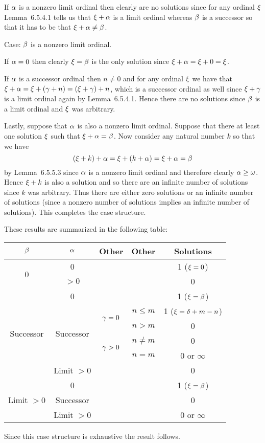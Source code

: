 \begin{solution}
    If $\alpha$ is a nonzero limit ordinal then clearly are no solutions since for any ordinal $\xi$ Lemma~6.5.4.1 tells us that $\xi + \alpha$ is a limit ordinal whereas $\beta$ is a successor so that it has to be that $\xi + \alpha \neq \beta$.

    Case: $\beta$ is a nonzero limit ordinal.

    If $\alpha = 0$ then clearly $\xi = \beta$ is the only solution since $\xi + \alpha = \xi + 0 = \xi$.

    If $\alpha$ is a successor ordinal then $n \neq 0$ and for any ordinal $\xi$ we have that $\xi + \alpha = \xi + (\gamma + n) = (\xi + \gamma) + n$, which is a successor ordinal as well since $\xi + \gamma$ is a limit ordinal again by Lemma~6.5.4.1.
    Hence there are no solutions since $\beta$ is a limit ordinal and $\xi$ was arbitrary.

    Lastly, suppose that $\alpha$ is also a nonzero limit ordinal.
    Suppose that there at least one solution $\xi$ such that $\xi + \alpha = \beta$.
    Now consider any natural number $k$ so that we have
    $$
    (\xi + k) + \alpha = \xi + (k + \alpha) = \xi + \alpha = \beta
    $$
    by Lemma~6.5.5.3 since $\alpha$ is a nonzero limit ordinal and therefore clearly $\alpha \geq \omega$.
    Hence $\xi + k$ is also a solution and so there are an infinite number of solutions since $k$ was arbitrary.
    Thus there are either zero solutions or an infinite number of solutions (since a nonzero number of solutions implies an infinite number of solutions).
    This completes the case structure.

    These results are summarized in the following table:
    \begin{center}
    \begin{tabular}{|c|c|c|c|c|}
        \hline
        $\beta$ & $\alpha$ & Other & Other & Solutions \\
        \hline
        \multirow{2}{*}{0} & 0 & & & 1 ($\xi = 0$) \\
        \cline{2-5}
        & $>0$ & & &  0 \\
        \hline
        \multirow{6}{*}{Successor} & 0 & & & 1 ($\xi = \beta$) \\
        \cline{2-5}
        & \multirow{4}{*}{Successor} & \multirow{2}{*}{$\gamma = 0$} & $n \leq m$ & 1 ($\xi = \delta + m - n$) \\
        \cline{4-5}
        & & & $n > m$ & 0 \\
        \cline{3-5}        
        & & \multirow{2}{*}{$\gamma > 0$} & $n \neq m$ & 0 \\
        \cline{4-5}
        & & & $n = m$ & 0 or $\infty$ \\
        \cline{2-5}
        & Limit $>0$ & & & 0 \\
        \hline
        \multirow{3}{*}{Limit $>0$} & 0 & & & 1 ($\xi =\beta$) \\
        \cline{2-5}
        & Successor & & & 0 \\
        \cline{2-5}
        & Limit $>0$ & & & 0 or $\infty$ \\
        \hline
    \end{tabular}
    \end{center}

    Since this case structure is exhaustive the result follows. \qedsymbol
\end{solution}


